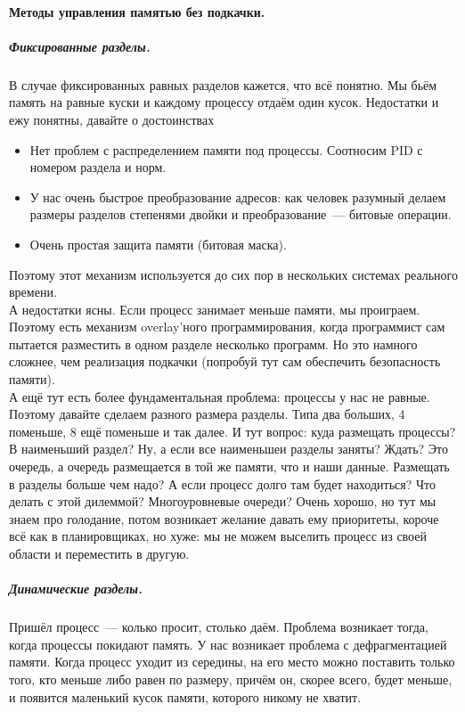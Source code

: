 \documentclass{article}
\begin{document}
    \paragraph{Методы управления памятью без подкачки.}
    \subparagraph{Фиксированные разделы.}
    В случае фиксированных равных разделов кажется, что всё понятно. Мы бьём память на равные куски и каждому процессу отдаём один кусок. Недостатки и ежу понятны, давайте о достоинствах
    \begin{itemize}
        \item Нет проблем с распределением памяти под процессы. Соотносим PID с номером раздела и норм.
        \item У нас очень быстрое преобразование адресов: как человек разумный делаем размеры разделов степенями двойки и преобразование~--- битовые операции.
        \item Очень простая защита памяти (битовая маска).
    \end{itemize}
    Поэтому этот механизм используется до сих пор в нескольких системах реального времени.\\
    А недостатки ясны. Если процесс занимает меньше памяти, мы проиграем. Поэтому есть механизм overlay'ного программирования, когда программист сам пытается разместить в одном разделе несколько программ. Но это намного сложнее, чем реализация подкачки (попробуй тут сам обеспечить безопасность памяти).\\
    А ещё тут есть более фундаментальная проблема: процессы у нас не равные. Поэтому давайте сделаем разного размера разделы. Типа два больших, 4 поменьше, 8 ещё поменьше и так далее. И тут вопрос: куда размещать процессы? В наименьший раздел? Ну, а если все наименьшеи разделы заняты? Ждать? Это очередь, а очередь размещается в той же памяти, что и наши данные. Размещать в разделы больше чем надо? А если процесс долго там будет находиться? Что делать с этой дилеммой? Многоуровневые очереди? Очень хорошо, но тут мы знаем про голодание, потом возникает желание давать ему приоритеты, короче всё как в планировщиках, но хуже: мы не можем выселить процесс из своей области и переместить в другую.
    \subparagraph{Динамические разделы.}
    Пришёл процесс~--- колько просит, столько даём. Проблема возникает тогда, когда процессы покидают память. У нас возникает проблема с дефрагментацией памяти. Когда процесс уходит из середины, на его место можно поставить только того, кто меньше либо равен по размеру, причём он, скорее всего, будет меньше, и появится маленький кусок памяти, которого никому не хватит.\\
\end{document}
